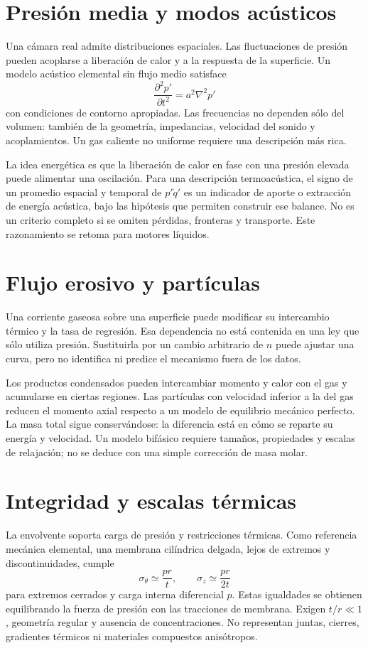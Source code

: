 \section{Presión media y modos acústicos}
Una cámara real admite distribuciones espaciales. Las fluctuaciones de presión pueden acoplarse a liberación de calor y a la respuesta de la superficie. Un modelo acústico elemental sin flujo medio satisface
\[
 \frac{\partial^2p'}{\partial t^2}=a^2\nabla^2p'
\]
con condiciones de contorno apropiadas. Las frecuencias no dependen sólo del volumen: también de la geometría, impedancias, velocidad del sonido y acoplamientos. Un gas caliente no uniforme requiere una descripción más rica.

La idea energética es que la liberación de calor en fase con una presión elevada puede alimentar una oscilación. Para una descripción termoacústica, el signo de un promedio espacial y temporal de $p'\dot q'$ es un indicador de aporte o extracción de energía acústica, bajo las hipótesis que permiten construir ese balance. No es un criterio completo si se omiten pérdidas, fronteras y transporte. Este razonamiento se retoma para motores líquidos.\cite{MIT22,MIT23}
\section{Flujo erosivo y partículas}
Una corriente gaseosa sobre una superficie puede modificar su intercambio térmico y la tasa de regresión. Esa dependencia no está contenida en una ley que sólo utiliza presión. Sustituirla por un cambio arbitrario de $n$ puede ajustar una curva, pero no identifica ni predice el mecanismo fuera de los datos.

Los productos condensados pueden intercambiar momento y calor con el gas y acumularse en ciertas regiones. Las partículas con velocidad inferior a la del gas reducen el momento axial respecto a un modelo de equilibrio mecánico perfecto. La masa total sigue conservándose: la diferencia está en cómo se reparte su energía y velocidad. Un modelo bifásico requiere tamaños, propiedades y escalas de relajación; no se deduce con una simple corrección de masa molar.\cite{MIT06}
\section{Integridad y escalas térmicas}
La envolvente soporta carga de presión y restricciones térmicas. Como referencia mecánica elemental, una membrana cilíndrica delgada, lejos de extremos y discontinuidades, cumple
\[
 \sigma_\theta\simeq\frac{pr}{t},\qquad
 \sigma_z\simeq\frac{pr}{2t}
\]
para extremos cerrados y carga interna diferencial $p$. Estas igualdades se obtienen equilibrando la fuerza de presión con las tracciones de membrana. Exigen $t/r\ll1$, geometría regular y ausencia de concentraciones. No representan juntas, cierres, gradientes térmicos ni materiales compuestos anisótropos.

